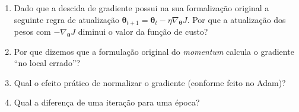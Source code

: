 \documentclass{dlproblemset}
\begin{document}
\begin{enumerate}[1)]
    \begin{enumerate}[(a)]
        \item Um \textit{batch size} menor torna o processo de treino mais ruidoso, auxiliando na diminuição de \textit{overfitting}.
        \item Um \textit{batch size} menor pode tornar a paralelização mais otimizada e portanto o treinamento mais rápido.
        \item Um \textit{batch size} menor pode levar a uma maior generalização da rede, evitando mínimos locais.
        \item Um \textit{batch size} menor reduz o ruído no treinamento, melhorando a generalização do modelo treinado.
        \item O hiperparâmetro \textit{batch size} apenas diz respeito a limitações de \textit{hardware} e não influencia a solução que será otimizada.
    \end{enumerate}

    \item Dado que a descida de gradiente possui na sua formalização original a seguinte regra de atualização $\boldsymbol{\theta}_{t+1}=\boldsymbol{\theta}_t-\eta \nabla_{\boldsymbol{\theta}} J$. Por que a atualização dos pesos com $-\nabla_{\boldsymbol{\theta}} J$ diminui o valor da função de custo?

    \item Por que dizemos que a formulação original do \textit{momentum} calcula o gradiente ``no local errado''?

    \item Qual o efeito prático de normalizar o gradiente (conforme feito no Adam)?

    \item Qual a diferença de uma iteração para uma época?


\end{enumerate}
\end{document}

